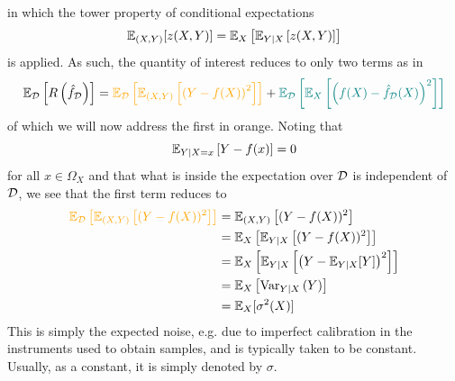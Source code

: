 \documentclass[11pt]{article}
\begin{document}
in which the tower property of conditional expectations
$$
\mathbb{E}_{(X,Y)}[z(X,Y)]
=
\mathbb{E}_X\left[\mathbb{E}_{Y|X}\left[z(X,Y)\right]\right]
$$
is applied. As such, the quantity of interest reduces to only two terms as in
$$
\E_{\D}\l[R\l(\hat{f}_{\D}\r)\r]
=
\textcolor{c5}{\E_{\D}\l[\E_{(X,Y)}\l[\l(Y-f(X)\r)^2\r]\r]}+\textcolor{c11}{\E_{\D}\l[\E_X\l[\l(f(X)-\hat{f}_{\D}(X)\r)^2\r]\r]}
$$
of which we will now address the first in orange. Noting that
$$
\mathbb{E}_{Y|X=x}\left[Y-f(x)\right]
=
0
$$
for all $x\in\Omega_X$ and that what is inside the expectation over $\mathcal{D}$ is independent of $\mathcal{D}$, we see that the first term reduces to
\begin{align*}
    \textcolor{c5}{\E_{\D}\l[\E_{(X,Y)}\l[(Y-f(X))^2\r]\r]}
    &=
    \E_{(X,Y)}\l[(Y-f(X))^2\r]\\
    &=
    \E_X\l[\E_{Y|X}\l[(Y-f(X))^2\r]\r]\\
    &=
    \E_X\l[\E_{Y|X}\l[\l(Y-\E_{Y|X}[Y]\r)^2\r]\r]\\
    &=
    \E_X\l[\text{Var}_{Y|X}\l(Y\r)\r]\\
    &=
    \E_X[\sigma^2(X)]
\end{align*}
This is simply the expected noise, e.g. due to imperfect calibration in the instruments used to obtain samples, and is typically taken to be constant. Usually, as a constant, it is simply denoted by $\sigma$.
\end{document}
